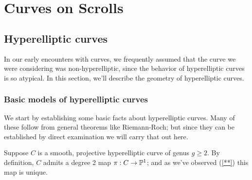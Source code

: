 

\chapter{Curves on Scrolls}
\label{ScrollsChapter}
\section{Hyperelliptic curves}

In our early encounters with curves, we frequently assumed that the curve we were considering was non-hyperelliptic, since the behavior of hyperelliptic curves is so atypical. In this section, we'll describe the geometry of hyperelliptic curves.

\subsection{Basic models of hyperelliptic curves}

We start by establishing some basic facts about hyperelliptic curves. Many of these follow from general theorems like Riemann-Roch; but since they can be established by direct examination we will carry that out here.

Suppose $C$ is a smooth, projective hyperelliptic curve of genus $g \geq 2$. By definition, $C$ admits a degree 2 map $\pi : C \to \PP^1$; and as we've observed (\ref{**}) this map is unique.

